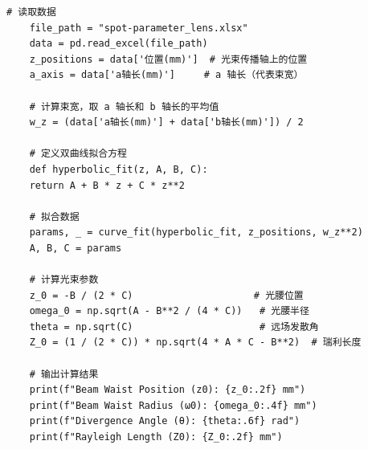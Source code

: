 \begin{lstlisting}[style=pythonstyle,caption=核心代码记录]
	# 读取数据
	file_path = "spot-parameter_lens.xlsx"
	data = pd.read_excel(file_path)
	z_positions = data['位置(mm)']  # 光束传播轴上的位置
	a_axis = data['a轴长(mm)']     # a 轴长（代表束宽）
	
	# 计算束宽，取 a 轴长和 b 轴长的平均值
	w_z = (data['a轴长(mm)'] + data['b轴长(mm)']) / 2
	
	# 定义双曲线拟合方程
	def hyperbolic_fit(z, A, B, C):
	return A + B * z + C * z**2
	
	# 拟合数据
	params, _ = curve_fit(hyperbolic_fit, z_positions, w_z**2)
	A, B, C = params
	
	# 计算光束参数
	z_0 = -B / (2 * C)                     # 光腰位置
	omega_0 = np.sqrt(A - B**2 / (4 * C))   # 光腰半径
	theta = np.sqrt(C)                      # 远场发散角
	Z_0 = (1 / (2 * C)) * np.sqrt(4 * A * C - B**2)  # 瑞利长度
	
	# 输出计算结果
	print(f"Beam Waist Position (z0): {z_0:.2f} mm")
	print(f"Beam Waist Radius (ω0): {omega_0:.4f} mm")
	print(f"Divergence Angle (θ): {theta:.6f} rad")
	print(f"Rayleigh Length (Z0): {Z_0:.2f} mm")
\end{lstlisting}

